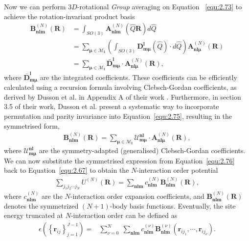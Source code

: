 Now we can perform $3D$-rotational \textit{Group} averaging on Equation ~\eqref{equ:2.73} to achieve the rotation-invariant product basis
\begin{equation}
\label{equ:2.75}
\begin{split}
    \textbf{B}^{(N)}_{\mathbf{nlm}}(\mathbf{R}) &= \int_{SO(3)} \textbf{A}^{(N)}_{\mathbf{nlm}}(\hat{Q}\mathbf{R})d\hat{Q}\\ &
    =\sum_{\boldsymbol{\mu}\in\mathcal{M}_{\textbf{l}}}
    \left(\int_{SO(3)}
\mathbf{D}^{\textbf{l}}_{\textbf{m}\boldsymbol{\mu}}(\hat{Q})\cdot d\hat{Q}
\right)
\textbf{A}^{(N)}_{\mathbf{nl}\boldsymbol{\mu}}(\mathbf{R})\\ &
=\sum_{\boldsymbol{\mu}\in\mathcal{M}_{\textbf{l}}}
\bar{\mathbf{D}}^{\textbf{l}}_{\textbf{m}\boldsymbol{\mu}}\cdot
\textbf{A}^{(N)}_{\mathbf{nl}\boldsymbol{\mu}}(\mathbf{R}),
\end{split}
\end{equation}
where $\bar{\mathbf{D}}^{\textbf{l}}_{\textbf{m}\boldsymbol{\mu}}$ are the integrated coefficients.
These coefficients can be efficiently calculated using a recursion formula involving Clebsch-Gordan coefficients, as derived by Dusson et al. in Appendix A of their work \cite{Dusson2022}. 
Furthermore, in section 3.5 of their work, Dusson et al. present a systematic way to incorporate permutation and parity invariance into Equation~\eqref{equ:2.75}, resulting in the symmetrised form,
\begin{equation}
\label{equ:2.76}
\begin{split}
    \textbf{B}^{(N)}_{\mathbf{nlm}}(\mathbf{R}) 
=\sum_{\boldsymbol{\mu}\in\mathcal{M}_{\textbf{l}}}
\mathcal{U}^{\textbf{nl}}_{\textbf{m}\boldsymbol{\mu}}\cdot
\textbf{A}^{(N)}_{\mathbf{nl}\boldsymbol{\mu}}(\mathbf{R}),
\end{split}
\end{equation}
where $\mathcal{U}^{\textbf{nl}}_{\textbf{m}\boldsymbol{\mu}}$ are the symmetry-adapted (generalised) Clebsch-Gordan coefficients.
We can now substitute the symmetrised expression from Equation~\eqref{equ:2.76} back to Equation~\eqref{equ:2.67} to obtain the $N$-interaction order potential
\begin{equation}
\label{equ:2.77}
\begin{split}
\sum_{{j}_{1}{j}_{2}\cdots{j}_{N}}U^{(N)}(\textbf{R})
=\sum_{\mathbf{nlm}}
c^{(N)}_{\mathbf{nlm}}\textbf{B}^{(N)}_{\mathbf{nlm}}(\mathbf{R}),
\end{split}
\end{equation}
where $c^{(N)}_{\mathbf{nlm}}$ are the $N$-interaction order expansion coefficients, and $\textbf{B}^{(N)}_{\mathbf{nlm}}(\mathbf{R})$ denotes the symmetrized $(N+1)$-body basis functions.
Eventually, the site energy truncated at $N$-interaction order can be defined as
\begin{equation}
\label{equ:2.78}
\begin{split}
    \epsilon(\left\{\mathbf{r}_{ij}\right\}_{j=1}^{J-1}) =&\sum^{N}_{\nu=0}\;\sum_{\mathbf{nlm}}
c^{(\nu)}_{\mathbf{nlm}}\textbf{B}^{(\nu)}_{\mathbf{nlm}}(\mathbf{r}_{i{j}_{1}},\cdots,\mathbf{r}_{i{j}_{\nu}}). \\
\end{split}
\end{equation}

